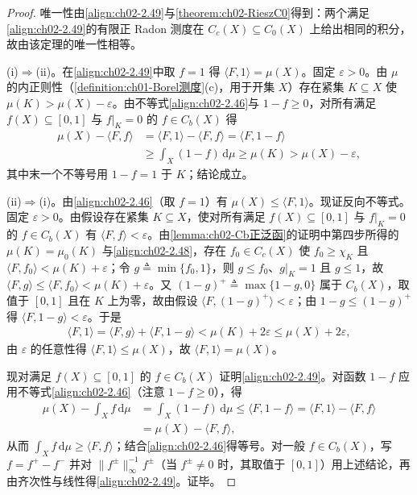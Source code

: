 \documentclass[../../main.tex]{subfiles}%
\begin{document}
\begin{proof}
唯一性由\eqref{align:ch02-2.49}与\cref{theorem:ch02-RieszC0}得到：两个满足\eqref{align:ch02-2.49}的有限正 Radon 测度在 $C_c(X)\subseteq C_0(X)$ 上给出相同的积分，故由该定理的唯一性相等。

(i)$\Rightarrow$(ii)。在\eqref{align:ch02-2.49}中取 $f=1$ 得 $\langle F,1\rangle=\mu(X)$。固定 $\varepsilon>0$。由 $\mu$ 的内正则性（\cref{definition:ch01-Borel测度}(c)，用于开集 $X$）存在紧集 $K\subseteq X$ 使 $\mu(K)>\mu(X)-\varepsilon$。由不等式\eqref{align:ch02-2.46}与 $1-f\geqslant0$，对所有满足 $f(X)\subseteq[0,1]$ 与 $f|_K=0$ 的 $f\in C_b(X)$ 得
\begin{align*}
\mu(X)-\langle F,f\rangle&=\langle F,1\rangle-\langle F,f\rangle=\langle F,1-f\rangle\\
&\geqslant\int_X(1-f)\,\mathrm{d}\mu\geqslant\mu(K)>\mu(X)-\varepsilon,
\end{align*}
其中末一个不等号用 $1-f=1$ 于 $K$；结论成立。

(ii)$\Rightarrow$(i)。由\eqref{align:ch02-2.46}（取 $f=1$）有 $\mu(X)\leqslant\langle F,1\rangle$。现证反向不等式。固定 $\varepsilon>0$。由假设存在紧集 $K\subseteq X$，使对所有满足 $f(X)\subseteq[0,1]$ 与 $f|_K=0$ 的 $f\in C_b(X)$ 有 $\langle F,f\rangle<\varepsilon$。由\cref{lemma:ch02-Cb正泛函}的证明中第四步所得的 $\mu(K)=\mu_0(K)$ 与\eqref{align:ch02-2.48}，存在 $f_0\in C_c(X)$ 使 $f_0\geqslant\chi_K$ 且 $\langle F,f_0\rangle<\mu(K)+\varepsilon$；令 $g\triangleq\min\{f_0,1\}$，则 $g\leqslant f_0$、$g|_K=1$ 且 $g\leqslant1$，故 $\langle F,g\rangle\leqslant\langle F,f_0\rangle<\mu(K)+\varepsilon$。又 $(1-g)^+\triangleq\max\{1-g,0\}$ 属于 $C_b(X)$，取值于 $[0,1]$ 且在 $K$ 上为零，故由假设 $\langle F,(1-g)^+\rangle<\varepsilon$；由 $1-g\leqslant(1-g)^+$ 得 $\langle F,1-g\rangle<\varepsilon$。于是
\begin{align*}
\langle F,1\rangle=\langle F,g\rangle+\langle F,1-g\rangle<\mu(K)+2\varepsilon\leqslant\mu(X)+2\varepsilon,
\end{align*}
由 $\varepsilon$ 的任意性得 $\langle F,1\rangle\leqslant\mu(X)$，故 $\langle F,1\rangle=\mu(X)$。

现对满足 $f(X)\subseteq[0,1]$ 的 $f\in C_b(X)$ 证明\eqref{align:ch02-2.49}。对函数 $1-f$ 应用不等式\eqref{align:ch02-2.46}（注意 $1-f\geqslant0$），得
\begin{align*}
\mu(X)-\int_Xf\,\mathrm{d}\mu&=\int_X(1-f)\,\mathrm{d}\mu\leqslant\langle F,1-f\rangle=\langle F,1\rangle-\langle F,f\rangle\\
&=\mu(X)-\langle F,f\rangle,
\end{align*}
从而 $\int_Xf\,\mathrm{d}\mu\geqslant\langle F,f\rangle$；结合\eqref{align:ch02-2.46}得等号。对一般 $f\in C_b(X)$，写 $f=f^+-f^-$ 并对 $\|f^\pm\|_\infty^{-1}f^\pm$（当 $f^\pm\neq0$ 时，其取值于 $[0,1]$）用上述结论，再由齐次性与线性得\eqref{align:ch02-2.49}。证毕。
\end{proof}
\end{document}
